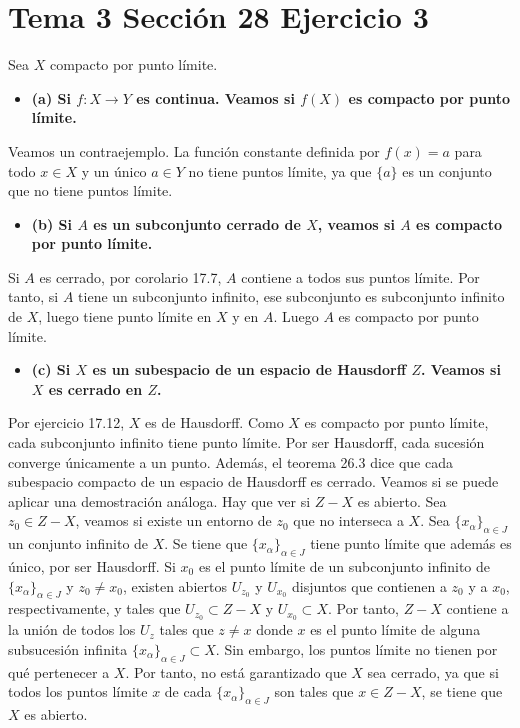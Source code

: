 \documentclass{article}
\begin{document}
\section{Tema 3 Sección 28 Ejercicio 3}
Sea $X$ compacto por punto límite.
\begin{itemize}
\item \bf (a) \rm Si $f:X\rightarrow Y$ es continua. Veamos si $f(X)$ es compacto por punto límite. 
\end{itemize}
Veamos un contraejemplo. La función constante definida por $f(x)=a$ para todo $x\in X$ y un único $a\in Y$ no tiene puntos límite, ya que $\{a\}$ es un conjunto que no tiene puntos límite.
\begin{itemize}
\item \bf (b) \rm Si $A$ es un subconjunto cerrado de $X$, veamos si $A$ es compacto por punto límite. 
\end{itemize}
Si $A$ es cerrado, por corolario 17.7, $A$ contiene a todos sus puntos límite. Por tanto, si $A$ tiene un subconjunto infinito, ese subconjunto es subconjunto infinito de $X$, luego tiene punto límite en $X$ y en $A$. Luego $A$ es compacto por punto límite.
\begin{itemize}
\item \bf (c) \rm Si $X$ es un subespacio de un espacio de Hausdorff $Z$. Veamos si $X$ es cerrado en $Z$. 
\end{itemize}
Por ejercicio 17.12, $X$ es de Hausdorff. Como $X$ es compacto por punto límite, cada subconjunto infinito tiene punto límite. Por ser Hausdorff, cada sucesión converge únicamente a un punto. Además, el teorema 26.3 dice que cada subespacio compacto de un espacio de Hausdorff es cerrado. Veamos si se puede aplicar una demostración análoga. Hay que ver si $Z-X$ es abierto. Sea $z_0\in Z-X$, veamos si existe un entorno de $z_0$ que no interseca a $X$. Sea $\{x_\alpha\}_{\alpha\in J}$ un conjunto infinito de $X$. Se tiene que $\{x_\alpha\}_{\alpha\in J}$ tiene punto límite que además es único, por ser Hausdorff. Si $x_0$ es el punto límite de un subconjunto infinito de $\{x_\alpha\}_{\alpha\in J}$ y $z_0\neq x_0$, existen abiertos $U_{z_0}$ y $U_{x_0}$ disjuntos que contienen a $z_0$ y a $x_0$, respectivamente, y tales que $U_{z_0}\subset Z-X$ y $U_{x_0}\subset X$. Por tanto, $Z-X$ contiene a la unión de todos los $U_z$ tales que $z\neq x$ donde $x$ es el punto límite de alguna subsucesión infinita $\{x_\alpha\}_{\alpha\in J}\subset X$. Sin embargo, los puntos límite no tienen por qué pertenecer a $X$. Por tanto, no está garantizado que $X$ sea cerrado, ya que si todos los puntos límite $x$ de cada $\{x_\alpha\}_{\alpha\in J}$ son tales que $x\in Z-X$, se tiene que $X$ es abierto.
\end{document}
